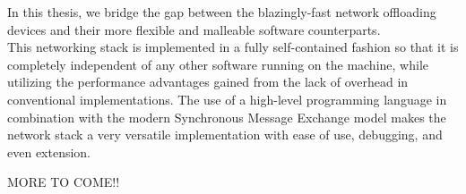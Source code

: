 In this thesis, we bridge the gap between the blazingly-fast network offloading
devices and their more flexible and malleable software counterparts.\\
This networking stack is implemented in a fully self-contained fashion so that 
it is completely independent of any other software running on the machine, while
utilizing the performance advantages gained from the lack of overhead in
conventional implementations. 
The use of a high-level programming language in combination with the modern 
Synchronous Message Exchange model makes the network stack a very versatile 
implementation with ease of use, debugging, and even extension. 




MORE TO COME!!




